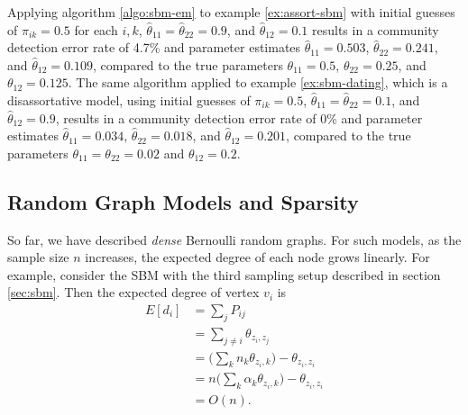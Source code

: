 \documentclass[
  12pt,
]{article}
\theoremstyle{definition}
\theoremstyle{definition}
\theoremstyle{definition}
\theoremstyle{definition}
\theoremstyle{remark}
\begin{document}
Applying algorithm \ref{algo:sbm-em} to example \ref{ex:assort-sbm} with initial guesses of \(\pi_{ik} = 0.5\) for each \(i, k\), \(\hat{\theta}_{11} = \hat{\theta}_{22} = 0.9\), and \(\hat{\theta}_{12} = 0.1\) results in a community detection error rate of 4.7\% and parameter estimates \(\hat{\theta}_{11} = 0.503\), \(\hat{\theta}_{22} = 0.241\), and \(\hat{\theta}_{12} = 0.109\), compared to the true parameters \(\theta_{11} = 0.5\), \(\theta_{22} = 0.25\), and \(\theta_{12} = 0.125\).
The same algorithm applied to example \ref{ex:sbm-dating}, which is a disassortative model, using initial guesses of \(\pi_{ik} = 0.5\), \(\hat{\theta}_{11} = \hat{\theta}_{22} = 0.1\), and \(\hat{\theta}_{12} = 0.9\), results in a community detection error rate of 0\% and parameter estimates \(\hat{\theta}_{11} = 0.034\), \(\hat{\theta}_{22} = 0.018\), and \(\hat{\theta}_{12} = 0.201\), compared to the true parameters \(\theta_{11} = \theta_{22} = 0.02\) and \(\theta_{12} = 0.2\).

\hypertarget{sec:sparsity}{%
\subsection{Random Graph Models and Sparsity}\label{sec:sparsity}}

So far, we have described \emph{dense} Bernoulli random graphs.
For such models, as the sample size \(n\) increases, the expected degree of each node grows linearly.
For example, consider the SBM with the third sampling setup described in section \ref{sec:sbm}.
Then the expected degree of vertex \(v_i\) is
\[
\begin{split}
E[d_i] & = \sum_j P_{ij} \\
& = \sum_{j \neq i} \theta_{z_i, z_j} \\ 
& = \Big( \sum_k n_k \theta_{z_i, k} \Big) - \theta_{z_i, z_i} \\
& = n \Big( \sum_k \alpha_k \theta_{z_i, k} \Big) - \theta_{z_i, z_i} \\
& = O(n).
\end{split}
\]
\end{document}
